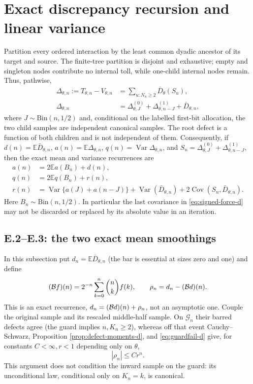 \documentclass[11pt]{article}
\numberwithin{equation}{section}
\newcommand{\1}{\mathbf 1}\newcommand{\F}{\mathcal F}\newcommand{\D}{\mathcal D}
\begin{document}
\section{Exact discrepancy recursion and linear variance}
Partition every ordered interaction by the least common dyadic ancestor of
its target and source.  The finite-tree partition is disjoint and exhaustive;
empty and singleton nodes contribute no internal toll, while one-child
internal nodes remain.  Thus, pathwise,
\begin{align}
 \Delta_{\theta,n}:=T_{\theta,n}-V_{\theta,n}
 &=\sum_{u:N_u\ge2}\bar D_\theta(S_u),                       \label{eq:finite-defect-sum}\\
 \Delta_{\theta,n}&=\Delta^{(0)}_{\theta,J}
 +\Delta^{(1)}_{\theta,n-J}+\bar D_{\theta,n},               \label{eq:delta-rec-d}
\end{align}
where $J\sim\mathrm{Bin}(n,1/2)$ and, conditional on the labelled first-bit
allocation, the two child samples are independent canonical samples.  The
root defect is a function of both children and is not independent of them.
Consequently, if $d(n)=\mathbb E\bar D_{\theta,n}$,
$a(n)=\mathbb E\Delta_{\theta,n}$, $q(n)=\operatorname{Var}\Delta_{\theta,n}$,
and $S_n=\Delta^{(0)}_{\theta,J}+\Delta^{(1)}_{\theta,n-J}$, then the exact
mean and variance recurrences are
\begin{align}
 a(n)&=2\mathbb Ea(B_n)+d(n),                                  \label{eq:amean-exact-d}\\
 q(n)&=2\mathbb Eq(B_n)+r(n),                                  \label{eq:qrec-d}\\
 r(n)&=\operatorname{Var}\{a(J)+a(n-J)\}
       +\operatorname{Var}(\bar D_{\theta,n})
       +2\operatorname{Cov}(S_n,\bar D_{\theta,n}).           \label{eq:signed-force-d}
\end{align}
Here $B_n\sim\mathrm{Bin}(n,1/2)$.  In particular the last covariance in
\eqref{eq:signed-force-d} may not be discarded or replaced by its absolute
value in an iteration.  \subsection{E.2--E.3: the two exact mean smoothings}
In this subsection put $d_n=\mathbb E\bar D_{\theta,n}$ (the bar is essential
at sizes zero and one) and define
\[
 ({\cal B}f)(n)=2^{-n}\sum_{k=0}^n{n\choose k}f(k),\qquad
 \rho_n=d_n-({\cal B}d)(n).
\]
This is an exact recurrence, $d_n=({\cal B}d)(n)+\rho_n$, not an
asymptotic one.  Couple the original sample and its rescaled middle-half
sample.  On $\mathcal G_n$ their barred defects agree (the guard implies
$n,K_n\ge2$), whereas off that event Cauchy--Schwarz, Proposition
\ref{prop:defect-moments-d}, and \eqref{eq:guardfail-d} give, for constants
$C<\infty,r<1$ depending only on $\theta$,
\begin{equation}|\rho_n|\le Cr^n.\label{eq:rho-d}\end{equation}
This argument does not condition the inward sample on the guard: its
unconditional law, conditional only on $K_n=k$, is canonical.
\end{document}
